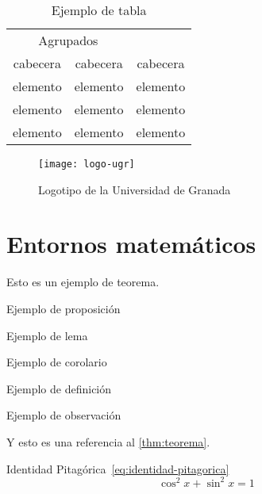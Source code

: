\begin{table}[htpb]
  \centering
  \begin{tabular}{ccc} \toprule
    \multicolumn{2}{c}{Agrupados} \\ \cmidrule(r){1-2}
    cabecera & cabecera & cabecera          \\ \midrule
    elemento & elemento & elemento          \\
    elemento & elemento & elemento          \\
    elemento & elemento & elemento          \\ \bottomrule
  \end{tabular}
  \caption{Ejemplo de tabla}
  \label{tb:ejemplo-tabla}
\end{table}

\begin{figure}[htpb]
  \centering
  \texttt{[image: logo-ugr]}
  \caption{Logotipo de la Universidad de Granada}
  \label{fig:logo-ugr}
\end{figure}

\section{Entornos matemáticos}

\begin{teorema}\label{thm:teorema}
Esto es un ejemplo de teorema.
\end{teorema}

\begin{proposicion}
Ejemplo de proposición
\end{proposicion}

\begin{lema}
Ejemplo de lema
\end{lema}

\begin{corolario}
Ejemplo de corolario
\end{corolario}

\begin{definicion}
Ejemplo de definición
\end{definicion}

\begin{observacion}
Ejemplo de observación
\end{observacion}

Y esto es una referencia al \autoref{thm:teorema}.

Identidad Pitagórica~\eqref{eq:identidad-pitagorica}
\begin{equation}\label{eq:identidad-pitagorica}
  \cos^2 x + \sin^2 x = 1
\end{equation}

